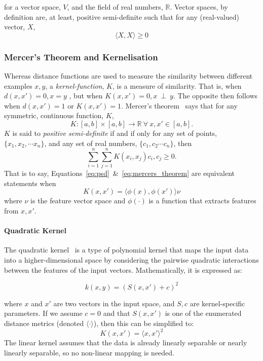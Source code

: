 \documentclass[conference]{IEEEtran}
\begin{document}
for a vector space, $V$, and the field of real numbers, $\mathbb{R}$. 
Vector spaces, by definition are, at least, positive semi-definite such that for any (real-valued) vector, $X$, 
\begin{equation}
\langle X, X \rangle \geq 0
\label{eq:psd}
\end{equation}

\subsubsection{Mercer's Theorem and Kernelisation}
\label{kernels}
Whereas distance functions are used to measure the similarity between different examples $x,y$, a \textit{kernel-function}, $K$, is a measure of similarity. That is, when $d(x,x') = 0, x = y$ , but when $K(x,x') = 0, x~\perp~y$. The opposite then follows when $d(x,x')=1$ or $K(x,x')=1$. Mercer's theorem~\cite{mercer} says that for any symmetric, continuous function, $K$,
$$
K : [a, b] \times [a, b] \rightarrow \mathbb{R}~\forall~x,x' \in [a,b].
$$
$K$ is said to \textit{positive semi-definite} if and if only for any set of points, $\{x_1, x_2, \cdots x_n\}$, and any set of real numbers, $\{ c_1, c_2 \cdots c_n\}$, then
\begin{equation}
\sum_{i=1}^n \sum_{j=1}^n K(x_i, x_j) c_i, c_j \geq 0.
\label{eq:mercers_theorem}
\end{equation}
That is to say, Equations~\ref{eq:psd}~\&~\ref{eq:mercers_theorem} are equivalent statements when 
$$
K(x, x') = \langle \phi(x), \phi(x') \rangle \nu
$$
where $\nu$ is the feature vector space and $\phi(\cdot)$ is a function that extracts features from $x,x'$.

\paragraph{Quadratic Kernel}
\label{quadratic_kernel}
The quadratic kernel~\cite{kernels} is a type of polynomial kernel that maps the input data into a higher-dimensional space by considering the pairwise quadratic interactions between the features of the input vectors. Mathematically, it is expressed as:

$$
k(x, y) = (S(x, x') + c)^2
$$

where $x$ and $x'$ are two vectors in the input space, and $S, c$ are kernel-specific parameters. 
If we assume $c=0$ and that $S(x,x')$ is one of the enumerated distance metrics (denoted $\langle \cdot \rangle $), then this can be simplified to:
$$
K(x, x') = \langle x, x' \rangle ^2
$$
The linear kernel assumes that the data is already linearly separable or nearly linearly separable, so no non-linear mapping is needed. 
\end{document}
